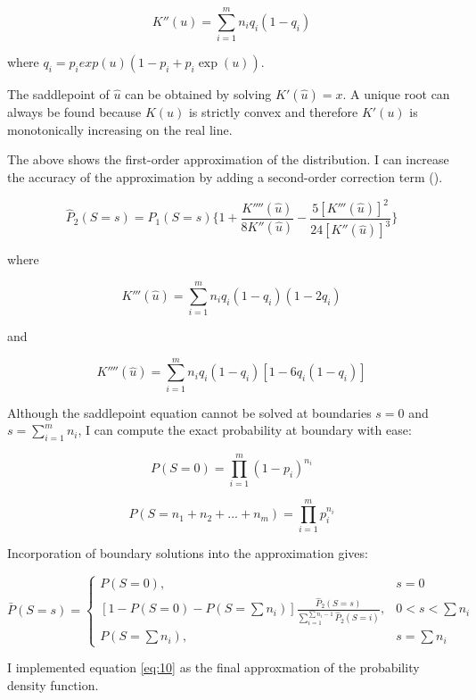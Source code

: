 \begin{equation}
K''(u) = \sum_{i=1}^m n_i q_i (1-q_i)
\end{equation}

where $q_i = p_i exp(u) (1-p_i + p_i \exp(u))$. 

The saddlepoint of $\hat{u}$ can be obtained by solving $K'(\hat{u})=x$. A unique root can always be found because $K(u)$ is strictly convex and therefore $K'(u)$ is monotonically increasing on the real line. 

The above shows the first-order approximation of the distribution. I can increase the accuracy of the approximation by adding a second-order correction term (\cite{Anonymous:0hq1uBaf}). 

\begin{equation}
\hat{P}_2(S=s)=\hat{P}_1(S=s)\Big\{1 + \frac{K''''(\hat{u})}{8K''(\hat{u})} - \frac{5[K'''(\hat{u})]^2}{24[K''(\hat{u})]^3}\Big\}
\end{equation}

where 

$$K'''(\hat{u}) = \sum_{i=1}^m n_i q_i (1-q_i) (1-2q_i)$$

and 

$$K''''(\hat{u}) = \sum_{i=1}^m n_i q_i (1-q_i) [1-6q_i(1-q_i)]$$

Although the saddlepoint equation cannot be solved at boundaries $s = 0$ and $s=\sum_{i=1}^m n_i$, I can compute the exact probability at boundary with ease: 

\begin{equation}
P(S=0) = \prod_{i=1}^m (1-p_i)^{n_i}
\end{equation}

\begin{equation}
P(S=n_1+n_2+...+n_m)=\prod_{i=1}^m p_i^{n_i}
\end{equation}

Incorporation of boundary solutions into the approximation gives: 

\begin{equation}
\bar{P}(S=s)=
\begin{cases}
P(S=0), & s=0 \\
[1-P(S=0)-P(S=\sum n_i)] \frac{\hat{P}_2(S=s)}{\sum_{i=1}^{\sum n_i-1} \hat{P}_2(S=i)}, & 0 < s < \sum n_i \\
P(S=\sum n_i), & s=\sum n_i 
\end{cases}
\label{eq:10}
\end{equation}

I implemented equation \ref{eq:10} as the final approxmation of the probability density function. 

